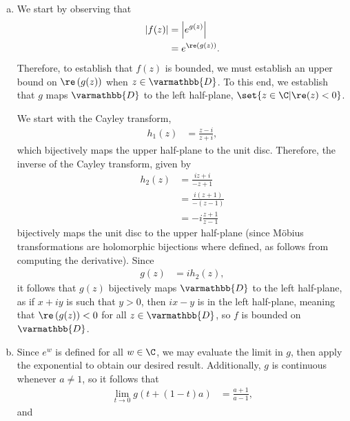 \documentclass[10pt]{mypackage}
\renewcommand*{\mathbb}[1]{\varmathbb{#1}}
\begin{document}
\begin{solution}\hfill
  \begin{enumerate}[(a)]
    \item We start by observing that
      \begin{align*}
        \left\vert f(z) \right\vert &= \left\vert e^{g(z)} \right\vert\\
                                    &= e^{\re\left( g(z) \right)}.
      \end{align*}
      Therefore, to establish that $f(z)$ is bounded, we must establish an upper bound on $\re\left( g(z) \right)$ when $z\in \mathbb{D}$. To this end, we establish that $g$ maps $ \mathbb{D} $ to the left half-plane, $\set{z\in \C | \re(z) < 0}$.\newline

      We start with the Cayley transform, 
      \begin{align*}
        h_1(z) &= \frac{z-i}{z+i},
      \end{align*}
      which bijectively maps the upper half-plane to the unit disc. Therefore, the inverse of the Cayley transform, given by
      \begin{align*}
        h_2(z) &= \frac{iz + i}{-z + 1}\\
               &= \frac{i\left( z+1 \right)}{-\left( z - 1 \right)}\\
               &= -i \frac{z+1}{z-1}
      \end{align*}
      bijectively maps the unit disc to the upper half-plane (since Möbius transformations are holomorphic bijections where defined, as follows from computing the derivative). Since
      \begin{align*}
        g(z) &= i h_2(z),
      \end{align*}
      it follows that $g(z)$ bijectively maps $ \mathbb{D} $ to the left half-plane, as if $x + iy$ is such that $y > 0$, then $ix - y$ is in the left half-plane, meaning that $\re\left( g(z) \right) < 0$ for all $z\in \mathbb{D}$, so $f$ is bounded on $ \mathbb{D} $.
    \item Since $e^{w}$ is defined for all $w\in \C$, we may evaluate the limit in $g$, then apply the exponential to obtain our desired result. Additionally, $g$ is continuous whenever $a\neq 1$, so it follows that
      \begin{align*}
        \lim_{t\rightarrow 0} g\left( t + \left( 1-t \right)a \right) &= \frac{a+1}{a-1},
      \end{align*}
      and
      \begin{align*}

\end{align*}
\end{enumerate}
\end{solution}
\end{document}
